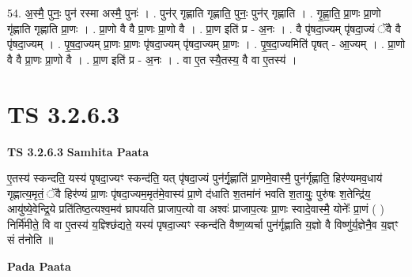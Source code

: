 \documentclass[17pt]{extarticle}
\begin{document}
54. अ॒स्मै॒ पुनः॒ पुन॑ रस्मा अस्मै॒ पुनः॑ । . पुन॑र् गृह्णाति गृह्णाति॒ पुनः॒ पुन॑र् गृह्णाति । . गृ॒ह्णा॒ति॒ प्रा॒णः प्रा॒णो गृ॑ह्णाति गृह्णाति प्रा॒णः । . प्रा॒णो वै वै प्रा॒णः प्रा॒णो वै । . प्रा॒ण इति॑ प्र - अ॒नः । . वै पृ॑षदा॒ज्यम् पृ॑षदा॒ज्यं ॅवै वै पृ॑षदा॒ज्यम् । . पृ॒ष॒दा॒ज्यम् प्रा॒णः प्रा॒णः पृ॑षदा॒ज्यम् पृ॑षदा॒ज्यम् प्रा॒णः । . पृ॒ष॒दा॒ज्यमिति॑ पृषत् - आ॒ज्यम् । . प्रा॒णो वै वै प्रा॒णः प्रा॒णो वै । . प्रा॒ण इति॑ प्र - अ॒नः । . वा ए॒त स्यै॒तस्य॒ वै वा ए॒तस्य॑ । \newline


\section{ TS 3.2.6.3 }

\textbf{TS 3.2.6.3 } \newline
\textbf{Samhita Paata} \newline

ए॒तस्य॑ स्कन्दति॒ यस्य॑ पृषदा॒ज्यꣳ स्कन्द॑ति॒ यत् पृ॑षदा॒ज्यं पुन॑र्गृ॒ह्णाति॑ प्रा॒णमे॒वास्मै॒ पुन॑र्गृह्णाति॒ हिर॑ण्यमव॒धाय॑ गृह्णात्य॒मृतं॒ ॅवै हिर॑ण्यं प्रा॒णः पृ॑षदा॒ज्यम॒मृत॑मे॒वास्य॑ प्रा॒णे द॑धाति श॒तमा॑नं भवति श॒तायुः॒ पुरु॑षः श॒तेन्द्रि॑य॒ आयु॑ष्ये॒वेन्द्रि॒ये प्रति॑तिष्ठ॒त्यश्व॒मव॑ घ्रापयति प्राजाप॒त्यो वा अश्वः॑ प्राजाप॒त्यः प्रा॒णः स्वादे॒वास्मै॒ योनेः᳚ प्रा॒णं ( ) निर्मि॑मीते॒ वि वा ए॒तस्य॑ य॒ज्ञ्श्छि॑द्यते॒ यस्य॑ पृषदा॒ज्यꣳ स्कन्द॑ति वैष्ण॒व्यर्चा पुन॑र्गृह्णाति य॒ज्ञो वै विष्णु॑र्य॒ज्ञेनै॒व य॒ज्ञ्ꣳ सं त॑नोति ॥ \newline

\textbf{Pada Paata} \newline
\end{document}
